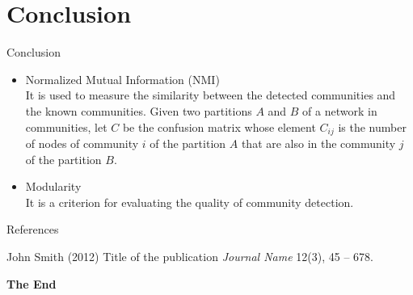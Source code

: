 \documentclass[aspectratio=169,xcolor=dvipsnames]{beamer}
\begin{document}
\section{Conclusion}

\begin{frame}{Conclusion}
    \begin{itemize}
        \item Normalized Mutual Information (NMI) \\
        It is used to measure the similarity between the detected communities and the known communities. Given two partitions $A$ and $B$ of a network in communities, let $C$ be the confusion matrix whose element $C_{ij}$ is the number of nodes of community $i$ of the partition $A$ that are also in the community $j$ of the partition $B$.
        \item Modularity \\
        It is a criterion for evaluating the quality of community detection.
    \end{itemize}
\end{frame}

\begin{frame}{References}
    \footnotesize{
        \begin{thebibliography}{99}
             John Smith (2012)
            \newblock Title of the publication
            \newblock \emph{Journal Name} 12(3), 45 -- 678.
        \end{thebibliography}
    }
\end{frame}


\begin{frame}
    \Huge{\centerline{\textbf{The End}}}
\end{frame}

\end{document}
